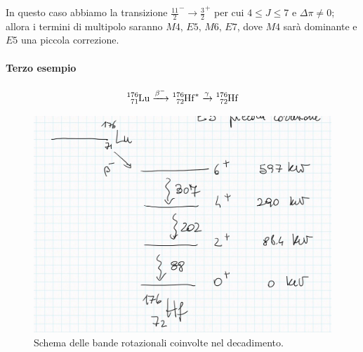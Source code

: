 \noindent In questo caso abbiamo la transizione $\frac{11}{2}^-\to\frac{3}{2}^+$ per cui $4\leq J \leq 7$ e $\Delta\pi \not = 0$; allora i termini di multipolo saranno $M4,\,E5,\,M6,\,E7$, dove $M4$ sarà dominante e $E5$ una piccola correzione.


\paragraph{Terzo esempio}
$$\ce{^{176}_{71}Lu}  \xrightarrow{\beta^-} \ce{^{176}_{72}Hf}^*  \xrightarrow{\gamma}  \ce{^{176}_{72}Hf}$$

\begin{figure}[h]
    \centering
    \includegraphics[scale=0.2]{Immagini/0310_bande3.png}
    \caption{Schema delle bande rotazionali coinvolte nel decadimento.}
    \label{0310_bande2}
\end{figure}

